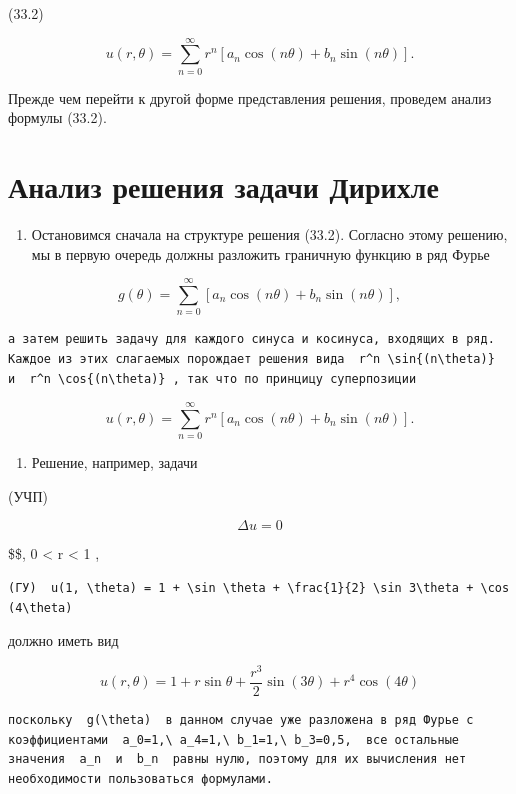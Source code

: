 \documentclass[
  ukrainian,
]{article}
\providecommand{\tightlist}{%
  \setlength{\itemsep}{0pt}\setlength{\parskip}{0pt}}
\begin{document}
(33.2)

\[
u(r, \theta) = \sum_{n=0}^{\infty} r^n \left[ a_n \cos(n\theta) + b_n \sin(n\theta) \right].
\]

Прежде чем перейти к другой форме представления решения, проведем анализ
формулы (33.2).

\section{Анализ решения задачи
Дирихле}\label{ux430ux43dux430ux43bux438ux437-ux440ux435ux448ux435ux43dux438ux44f-ux437ux430ux434ux430ux447ux438-ux434ux438ux440ux438ux445ux43bux435}

\begin{enumerate}
\def\labelenumi{\arabic{enumi}.}
\tightlist
\item
  Остановимся сначала на структуре решения (33.2). Согласно этому
  решению, мы в первую очередь должны разложить граничную функцию в ряд
  Фурье
\end{enumerate}

\[
g(\theta) = \sum_{n=0}^{\infty} [a_n \cos(n\theta) + b_n \sin(n\theta)],
\]

\begin{verbatim}
а затем решить задачу для каждого синуса и косинуса, входящих в ряд. Каждое из этих слагаемых порождает решения вида  r^n \sin{(n\theta)}  и  r^n \cos{(n\theta)} , так что по принцицу суперпозиции
\end{verbatim}

\[
u(r, \theta) = \sum_{n=0}^{\infty} r^n [a_n \cos(n\theta) + b_n \sin(n\theta)].
\]

\begin{enumerate}
\def\labelenumi{\arabic{enumi}.}
\setcounter{enumi}{1}
\tightlist
\item
  Решение, например, задачи
\end{enumerate}

(УЧП)

\[
\Delta u = 0
\]

\$\$, 0 \textless{} r \textless{} 1 ,

\begin{verbatim}
(ГУ)  u(1, \theta) = 1 + \sin \theta + \frac{1}{2} \sin 3\theta + \cos (4\theta)
\end{verbatim}

должно иметь вид

\[
u(r, \theta) = 1 + r \sin \theta + \frac{r^3}{2} \sin (3\theta) + r^4 \cos (4\theta)
\]

\begin{verbatim}
поскольку  g(\theta)  в данном случае уже разложена в ряд Фурье с коэффициентами  a_0=1,\ a_4=1,\ b_1=1,\ b_3=0,5,  все остальные значения  a_n  и  b_n  равны нулю, поэтому для их вычисления нет необходимости пользоваться формулами.
\end{verbatim}
\end{document}

